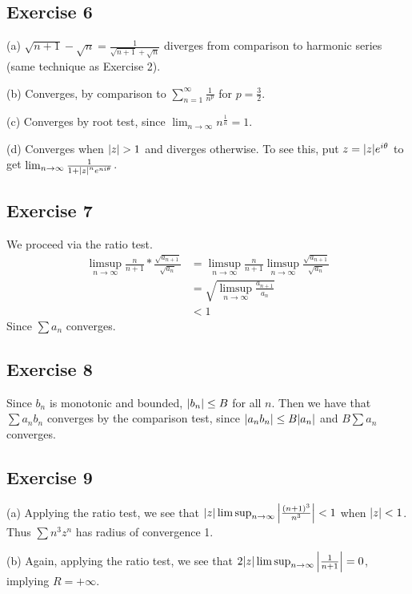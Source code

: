 \subsection{Exercise 6}
(a) $\sqrt{n + 1} - \sqrt{n} = \frac{1}{\sqrt{n + 1} + \sqrt{n}}$ diverges from comparison
to harmonic series (same technique as Exercise 2).

(b) Converges, by comparison to $\sum_{n = 1}^{\infty} \frac{1}{n^p}$ for $p = \frac{3}{2}$.

(c) Converges by root test, since $\lim_{n \to \infty} n^{\frac{1}{n}} = 1$.

(d) Converges when $\abs{z} > 1$ and diverges otherwise. To see this, put $z = \abs{z}e^{i\theta}$ 
to get $\lim_{n \to \infty} \frac{1}{1 + \abs{z}^n e^{ni\theta}}$.

\subsection{Exercise 7}
We proceed via the ratio test. 
\begin{align*}
        \limsup_{n \to \infty} \frac{n}{n+1} * \frac{\sqrt{a_{n + 1}}}{\sqrt{a_n}} &= \limsup_{n \to \infty} \frac{n}{n+1} \limsup_{n \to  \infty} \frac{\sqrt{a_{n+1}}}{\sqrt{a_n}} \\
                                                                                   &= \sqrt{\limsup_{n \to \infty} \frac{a_{n+1}}{a_n}} \\
                                                                                   &< 1
\end{align*}
Since $\sum a_n$ converges.

\subsection{Exercise 8}
Since $b_n$ is monotonic and bounded, $\abs{b_n} \leq B$ for all $n$. Then we have that $\sum a_n b_n$
converges by the comparison test, since $\abs{a_n b_n} \leq B \abs{a_n}$ and $B \sum a_n$ converges.

\subsection{Exercise 9}
(a) Applying the ratio test, we see that $\abs{z} \limsup_{n \to  \infty} \abs{\frac{(n + 1)^3}{n^3}} < 1$ 
when $\abs{z} < 1$. Thus $\sum n^3 z^n$ has radius of convergence 1.

(b) Again, applying the ratio test, we see that $2 \abs{z} \limsup_{n \to \infty} \abs{\frac{1}{n + 1}} = 0$,
implying $R = +\infty$.

